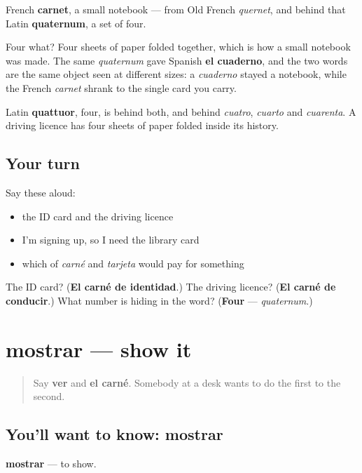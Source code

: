 \begin{cousinweb}
French \textbf{carnet}, a small notebook — from Old French \emph{quernet}, and behind that Latin \textbf{quaternum}, a set of four.

Four what? Four sheets of paper folded together, which is how a small notebook was made. The same \emph{quaternum} gave Spanish \textbf{el cuaderno}, and the two words are the same object seen at different sizes: a \emph{cuaderno} stayed a notebook, while the French \emph{carnet} shrank to the single card you carry.

Latin \textbf{quattuor}, four, is behind both, and behind \emph{cuatro}, \emph{cuarto} and \emph{cuarenta}. A driving licence has four sheets of paper folded inside its history.
\end{cousinweb}

\subsection*{Your turn}
Say these aloud:

\begin{itemize}
\raggedright
  \item the ID card and the driving licence
  \item I'm signing up, so I need the library card
  \item which of \emph{carné} and \emph{tarjeta} would pay for something
\end{itemize}

\begin{tcolorbox}[breakable,colback=teal!4,colframe=teal!35!black,title={Before you move on}]
The ID card? (\textbf{El carné de identidad}.) The driving licence? (\textbf{El carné de conducir}.) What number is hiding in the word? (\textbf{Four} — \emph{quaternum}.)
\end{tcolorbox}
\section[mostrar]{mostrar — show it}

\label{lesson:ES-C451-mostrar}



\begin{quote}
Say \textbf{ver} and \textbf{el carné}. Somebody at a desk wants to do the first to the second.
\end{quote}

\subsection*{You'll want to know: mostrar}
\textbf{mostrar} — to show.

